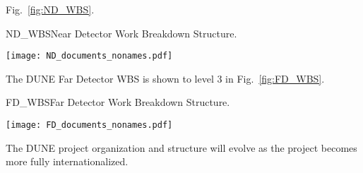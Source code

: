 Fig.~\ref{fig:ND_WBS}.
\begin{cdrfigure}{ND_WBS}{Near Detector Work Breakdown Structure.}
\centering
\begin{center}
\texttt{[image: ND\_documents\_nonames.pdf]}
\end{center}
\end{cdrfigure}
The DUNE Far Detector WBS is shown to level 3 in 
Fig.~\ref{fig:FD_WBS}.
\begin{cdrfigure}{FD_WBS}{Far Detector Work Breakdown Structure.}
\centering
\begin{center}
\texttt{[image: FD\_documents\_nonames.pdf]}
\end{center}
\end{cdrfigure}

The DUNE project organization and structure will evolve as the project
becomes more fully internationalized.
